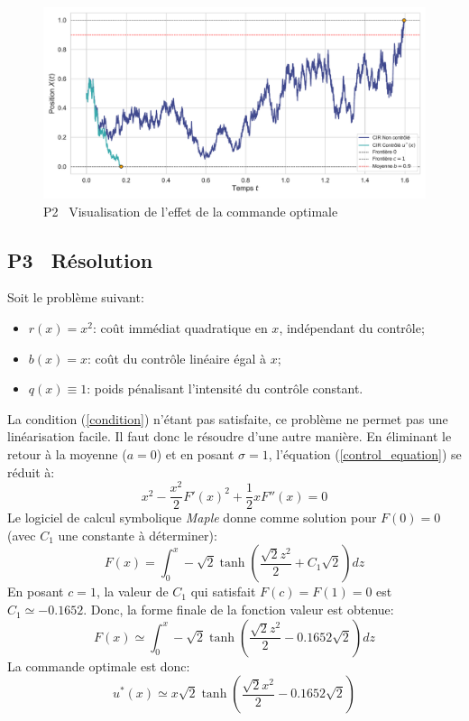 \begin{figure}[htb]
    \centering
    \includegraphics[width=0.9\linewidth]{img/validation/P2/p2_control_simulation.pdf}
    \caption{P2 \textemdash~Visualisation de l'effet de la commande optimale}\label{fig:Simulation2}
\end{figure}\FloatBarrier\subsection{P3 \textemdash~Résolution}\label{p3}
Soit le problème suivant:
\begin{itemize}
    \item $r(x) = x^2$: coût immédiat quadratique en $x$, indépendant du contrôle;
    \item $b(x) = x$: coût du contrôle linéaire égal à $x$;
    \item $q(x) \equiv 1$: poids pénalisant l'intensité du contrôle constant.
\end{itemize}
La condition (\ref{condition}) n'étant pas satisfaite, ce problème ne permet pas une linéarisation facile. Il faut donc le résoudre d'une autre manière. En éliminant le retour à la moyenne ($a=0$) et en posant $\sigma=1$, l'équation (\ref{control_equation}) se réduit à:
\begin{equation}\label{reduced_control_equation}
    x^2-\frac{x^2}{2}{F'(x)}^2+\frac{1}{2}xF''(x)=0
\end{equation}
Le logiciel de calcul symbolique \textit{Maple} donne comme solution pour $F(0)=0$ (avec $C_1$ une constante à déterminer):
\[
    F(x)=\int_0^x-\sqrt{2}\tanh\left(\frac{\sqrt{2}z^2}{2}+C_1\sqrt{2}\right)dz
\]
En posant $c=1$, la valeur de $C_1$ qui satisfait $F(c)=F(1)=0$ est $C_1\simeq -0.1652$. Donc, la forme finale de la fonction valeur est obtenue:
\begin{equation}\label{sol_control_3}
    F(x)\simeq \int_0^x-\sqrt{2}\tanh\left(\frac{\sqrt{2}z^2}{2}-0.1652\sqrt{2}\right)dz
\end{equation}
La commande optimale est donc:
\begin{equation}\label{optimal_control_3}
    u^*(x)\simeq x\sqrt{2}\tanh\left(\frac{\sqrt{2}x^2}{2}-0.1652\sqrt{2}\right)
\end{equation}
